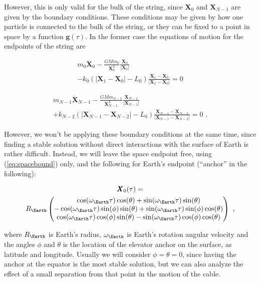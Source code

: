 \documentclass[8 pt, twocolumn]{article}
\renewcommand{\vec}[1]{\pmb{#1}}
\begin{document}
However, this is only valid for the bulk of the string, since $\vec{X}_0$ and $\vec{X}_{N-1}$ are given by the boundary conditions. These conditions may be given by how one particle is connected to the bulk of the string, or they can be fixed to a point in space by a function $\vec{g}(\tau)$. In the former case the equations of motion for the endpoints of the string are

\begin{multline}
  m_0 \vec{\ddot X}_0 - \frac{G M m_0}{\vec{X}^2_0} \frac{\vec{X}_0}{|\vec{X}_0|} \\
  -k_{0}(\left|\vec{X}_{1} - \vec{X}_{0}\right| - L_0) \frac{\vec{X}_{1}- \vec{X}_{0}}{\left|\vec{X}_{1} - \vec{X}_{0}\right|} = 0
\end{multline}

\begin{multline}\label{eq:spacebound}
  m_{N-1} \vec{\ddot X}_{N-1} - \frac{G M m_{N-1}}{\vec{X}^2_{N-1}} \frac{\vec{X}_{N-1}}{|\vec{X}_{N-1}|} \\
  +k_{N-2}(\left|\vec{X}_{N-1} - \vec{X}_{N-2}\right| - L_0) \frac{\vec{X}_{N-1}- \vec{X}_{N-2}}{\left|\vec{X}_{N-1} - \vec{X}_{N-2}\right|} = 0 \text{ .}
\end{multline}

However, we won't be applying these boundary conditions at the same time, since finding a stable solution without direct interactions with the surface of Earth is rather difficult. Instead, we will leave the space endpoint free, using (\ref{eq:spacebound}) only, and the following for Earth's endpoint (``anchor'' in the following):

\begin{multline}
  \vec{X}_0(\tau) = \\ R_\Earth
    \begin{pmatrix}
      \cos(\omega_\Earth \tau) \cos(\theta) + \sin(\omega_\Earth \tau) \sin(\theta) \\
      -\cos(\omega_\Earth \tau) \sin(\phi) \sin(\theta) + \sin(\omega_\Earth \tau) \sin(\phi) \cos(\theta) \\
      \cos(\omega_\Earth \tau) \cos(\phi) \sin(\theta) - \sin(\omega_\Earth \tau) \cos(\phi) \cos(\theta)
    \end{pmatrix}
  \text{ ,}
\end{multline}

where $R_\Earth$ is Earth's radius, $\omega_\Earth$ is Earth's rotation angular velocity and the angles $\phi$ and $\theta$ is the location of the elevator anchor on the surface, as latitude and longitude. Usually we will consider $\phi = \theta = 0$, since having the anchor at the equator is the most stable solution, but we can also analyze the effect of a small separation from that point in the motion of the cable.
\end{document}
